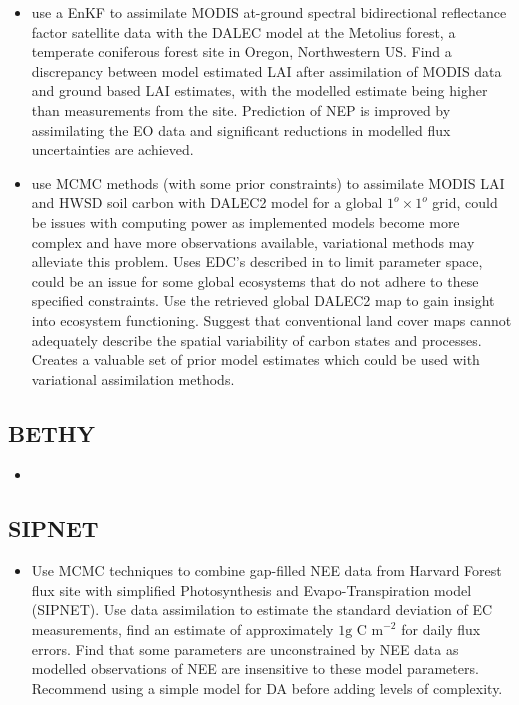 \documentclass[12pt, a4paper]{article}
\begin{document}
\begin{itemize}
\item \citet{Quaife2008} use a EnKF to assimilate MODIS at-ground spectral bidirectional reflectance factor satellite data with the DALEC model at the Metolius forest, a temperate coniferous forest site in Oregon, Northwestern US. Find a discrepancy between model estimated LAI after assimilation of MODIS data and ground based LAI estimates, with the modelled estimate being higher than measurements from the site. Prediction of NEP is improved by assimilating the EO data and significant reductions in modelled flux uncertainties are achieved.    

\item \citet{bloom2016decadal} use MCMC methods (with some prior constraints) to assimilate MODIS LAI and HWSD soil carbon with DALEC2 model for a global \(1^o \times 1^o\) grid, could be issues with computing power as implemented models become more complex and have more observations available, variational methods may alleviate this problem. Uses EDC's described in \citet{Bloom2015} to limit parameter space, could be an issue for some global ecosystems that do not adhere to these specified constraints. Use the retrieved global DALEC2 map to gain insight into ecosystem functioning. Suggest that conventional land cover maps cannot adequately describe  the spatial variability of carbon states and processes. Creates a valuable set of prior model estimates which could be used with variational assimilation methods.

\end{itemize}


\subsection{BETHY}

\begin{itemize}

\item \citet{rayner2005two}

\end{itemize}

\subsection{SIPNET}

\begin{itemize}

\item \citet{braswell2005estimating} Use MCMC techniques to combine gap-filled NEE data from Harvard Forest flux site with simplified Photosynthesis and Evapo-Transpiration model (SIPNET). Use data assimilation to estimate the standard deviation of EC measurements, find an estimate of approximately \(1 \text{g C m}^{-2}\) for daily flux errors. Find that some parameters are unconstrained by NEE data as modelled observations of NEE are insensitive to these model parameters. Recommend using a simple model for DA before adding levels of complexity.  

\end{itemize}
\end{document}

